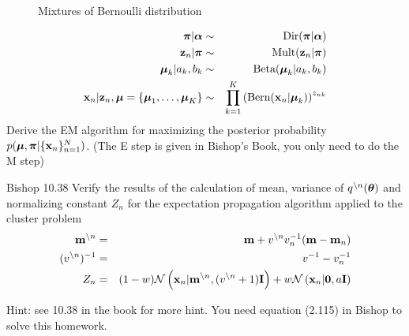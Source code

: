 \documentclass{amsmlaj}
\begin{document}
\begin{problem}
\begin{figure}[H]
\begin{center}
\caption{Mixtures of Bernoulli distribution}
\label{fig:mixbern}
\end{center}
\end{figure}
\begin{eqnarray}
\bm{\mathbf{\pi}}|\bm{\mathbf{\alpha}} & \sim & \text{Dir}(\bm{\mathbf{\pi}}|\bm{\mathbf{\alpha}}) \nonumber\\
\bm{\mathbf{z}}_n | \bm{\mathbf{\pi}} & \sim & \text{Mult}(\bm{\mathbf{z}}_n | \bm{\mathbf{\pi}}) \nonumber\\
\bm{\mathbf{\mu}}_k|a_k, b_k & \sim & \text{Beta}(\bm{\mathbf{\mu}}_k|a_k, b_k) \nonumber\\
\bm{\mathbf{x}}_n|\bm{\mathbf{z}}_n, \bm{\mathbf{\mu}}=\{\bm{\mathbf{\mu}}_1, \dotsc, \bm{\mathbf{\mu}}_K\} & \sim & \prod\limits_{k=1}^K\left(\text{Bern}(\bm{\mathbf{x}}_n|\bm{\mathbf{\mu}}_k)\right)^{z_{nk}} \nonumber
\end{eqnarray}
Derive the EM algorithm for maximizing the posterior probability $p(\bm{\mathbf{\mu}},\bm{\mathbf{\pi}}|\{ \bm{\mathbf{x}}_n\}_{n=1}^N)$. (The E step is given in Bishop's Book, you only need to do the M step)

\end{problem}

\begin{problem}\textsf{Bishop 10.38}
Verify the results of the calculation of mean, variance of $q^{\backslash n}(\bm{\mathbf{\theta}})$ and normalizing constant $Z_n$ for the expectation propagation algorithm applied to the cluster problem
\begin{eqnarray}
\bm{\mathbf{m}}^{\backslash n} & = & \bm{\mathbf{m}} + v^{\backslash n}v_n^{-1}(\bm{\mathbf{m}}-\bm{\mathbf{m}}_n)\\
(v^{\backslash n})^{-1} & = & v^{-1} - v_n^{-1}\\
Z_n & = & (1-w)\mathcal{N}\left(\bm{\mathbf{x}}_n|\bm{\mathbf{m}}^{\backslash n}, (v^{\backslash n}+1)\bm{\mathbf{I}}\right) + w\mathcal{N}\left(\bm{\mathbf{x}}_n|\bm{\mathbf{0}},a\bm{\mathbf{I}}\right)
\end{eqnarray}

Hint: see 10.38 in the book for more hint. You need equation (2.115) in Bishop to solve this homework.
\end{problem}
\end{document}
